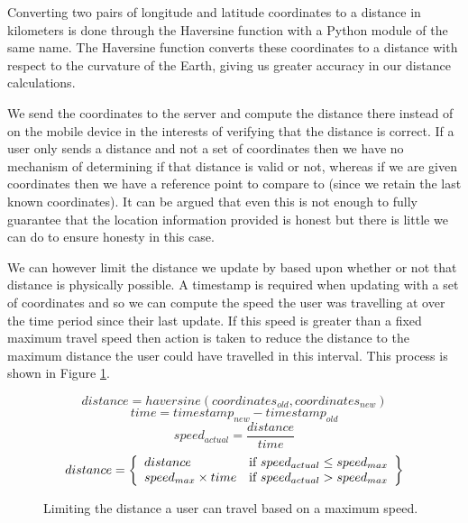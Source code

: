Converting two pairs of longitude and latitude coordinates to a
distance in kilometers is done through the Haversine
function\cite{haversine} with a Python module of the same
name\cite{python_haversine}. The Haversine function converts these
coordinates to a distance with respect to the curvature of the Earth,
giving us greater accuracy in our distance calculations.

We send the coordinates to the server and compute the distance there
instead of on the mobile device in the interests of verifying that
the distance is correct. If a user only sends a distance and not a
set of coordinates then we have no mechanism of determining if that
distance is valid or not, whereas if we are given coordinates then we
have a reference point to compare to (since we retain the last known
coordinates). It can be argued that even this is not enough to fully
guarantee that the location information provided is honest but there
is little we can do to ensure honesty in this case. 

We can however limit the distance we update by based upon whether or
not that distance is physically possible. A timestamp is required when
updating with a set of coordinates and so we can compute the speed the
user was travelling at over the time period since their last
update. If this speed is greater than a fixed maximum travel speed
then action is taken to reduce the distance to the maximum distance
the user could have travelled in this interval. This process is shown
in Figure \ref{fig:distance_limit}.

\begin{figure}[h]
\begin{equation}
  distance = haversine(coordinates_{old}, coordinates_{new})
\end{equation}
\begin{equation}
  time = timestamp_{new} - timestamp_{old}
\end{equation}
\begin{equation}
  speed_{actual} = \frac{distance}{time}
\end{equation}
\begin{equation}
  distance = \left\{
  \begin{array}{l l}
    distance & \text{if $speed_{actual} \leq speed_{max}$} \\
    speed_{max} \times time & \text{if $speed_{actual} > speed_{max} $}
  \end{array}
  \right\}
\end{equation}
\caption{Limiting the distance a user can travel based on a maximum speed.}
\label{fig:distance_limit}
\end{figure}

